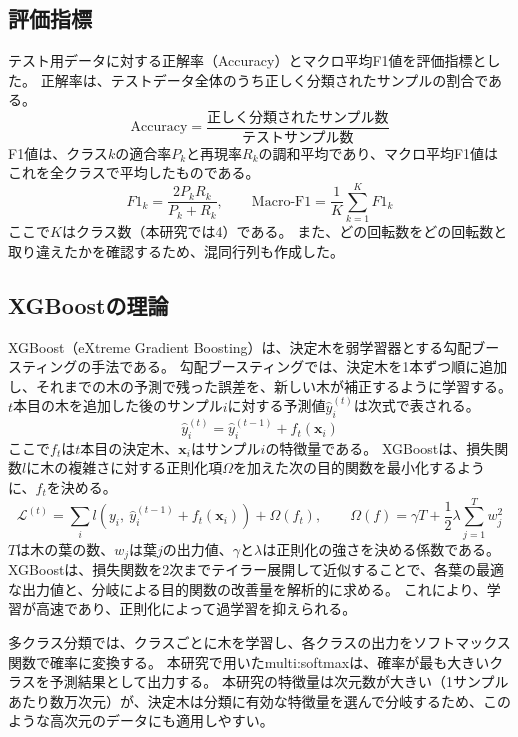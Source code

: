 \documentclass[uplatex, 12pt]{ujbook}
\begin{document}
\subsection{評価指標}
テスト用データに対する正解率（Accuracy）とマクロ平均F1値を評価指標とした。
正解率は、テストデータ全体のうち正しく分類されたサンプルの割合である。
\begin{equation}
  \mathrm{Accuracy} = \frac{\text{正しく分類されたサンプル数}}{\text{テストサンプル数}}
\end{equation}
F1値は、クラス$k$の適合率$P_k$と再現率$R_k$の調和平均であり、マクロ平均F1値はこれを全クラスで平均したものである。
\begin{equation}
  F1_k = \frac{2P_kR_k}{P_k+R_k},\qquad
  \mathrm{Macro\mbox{-}F1} = \frac{1}{K}\sum_{k=1}^{K} F1_k
\end{equation}
ここで$K$はクラス数（本研究では4）である。
また、どの回転数をどの回転数と取り違えたかを確認するため、混同行列も作成した。

\subsection{XGBoostの理論}
XGBoost（eXtreme Gradient Boosting）は、決定木を弱学習器とする勾配ブースティングの手法である\cite{xgboost}。
勾配ブースティングでは、決定木を1本ずつ順に追加し、それまでの木の予測で残った誤差を、新しい木が補正するように学習する。
$t$本目の木を追加した後のサンプル$i$に対する予測値$\hat{y}_i^{(t)}$は次式で表される。
\begin{equation}
  \hat{y}_i^{(t)} = \hat{y}_i^{(t-1)} + f_t(\boldsymbol{x}_i)
\end{equation}
ここで$f_t$は$t$本目の決定木、$\boldsymbol{x}_i$はサンプル$i$の特徴量である。
XGBoostは、損失関数$l$に木の複雑さに対する正則化項$\Omega$を加えた次の目的関数を最小化するように、$f_t$を決める。
\begin{equation}
  \mathcal{L}^{(t)} = \sum_{i} l\left(y_i,\ \hat{y}_i^{(t-1)} + f_t(\boldsymbol{x}_i)\right) + \Omega(f_t),\qquad
  \Omega(f) = \gamma T + \frac{1}{2}\lambda \sum_{j=1}^{T} w_j^2
\end{equation}
$T$は木の葉の数、$w_j$は葉$j$の出力値、$\gamma$と$\lambda$は正則化の強さを決める係数である。
XGBoostは、損失関数を2次までテイラー展開して近似することで、各葉の最適な出力値と、分岐による目的関数の改善量を解析的に求める。
これにより、学習が高速であり、正則化によって過学習を抑えられる。

多クラス分類では、クラスごとに木を学習し、各クラスの出力をソフトマックス関数で確率に変換する。
本研究で用いたmulti:softmaxは、確率が最も大きいクラスを予測結果として出力する。
本研究の特徴量は次元数が大きい（1サンプルあたり数万次元）が、決定木は分類に有効な特徴量を選んで分岐するため、このような高次元のデータにも適用しやすい。
\end{document}
